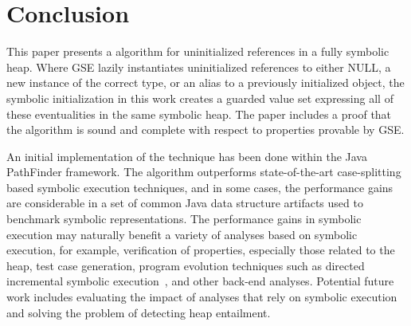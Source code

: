 \section{Conclusion}

This paper presents a \symtxt{} algorithm for uninitialized
references in a fully symbolic heap. Where GSE lazily instantiates
uninitialized references to either NULL, a new instance of the correct
type, or an alias to a previously initialized object, the symbolic
initialization in this work creates a guarded value set expressing all
of these eventualities in the same symbolic heap. The paper includes a proof that the
\symtxt{} algorithm is sound and complete with respect to properties
provable by GSE.

An initial implementation of the technique has been done within the
Java PathFinder framework. The \symtxt{} algorithm outperforms
state-of-the-art case-splitting based symbolic execution techniques,
and in some cases, the performance gains are considerable in a set of
common Java data structure artifacts used to benchmark symbolic representations. The performance gains in symbolic
execution may naturally benefit a variety of analyses based on
symbolic execution, for example, verification of properties,
especially those related to the heap, test case generation, program
evolution techniques such as directed incremental symbolic
execution~\cite{person:pldi2011}, and other back-end
analyses. Potential future work includes evaluating the impact of
analyses that rely on symbolic execution and solving the problem of detecting heap entailment.

